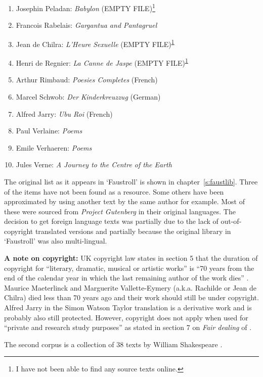 \begin{enumerate}[start=0]
\item Josephin Peladan: \textit{Babylon} (EMPTY FILE)\footnote{I have not been able to find any source texts online.\label{emptyfile}}
\item Francois Rabelais: \textit{Gargantua and Pantagruel}
\item Jean de Chilra: \textit{L'Heure Sexuelle} (EMPTY FILE)\textsuperscript{\ref{emptyfile}}
\item Henri de Regnier: \textit{La Canne de Jaspe} (EMPTY FILE)\textsuperscript{\ref{emptyfile}}
\item Arthur Rimbaud: \textit{Poesies Completes} (French)
\item Marcel Schwob: \textit{Der Kinderkreuzzug} (German)
\item Alfred Jarry: \textit{Ubu Roi} (French)
\item Paul Verlaine: \textit{Poems}
\item Emile Verhaeren: \textit{Poems}
\item Jules Verne: \textit{A Journey to the Centre of the Earth}
\end{enumerate}

The original list as it appears in `Faustroll' is shown in chapter~\ref{s:faustlib}. Three of the items have not been found as a resource. Some others have been approximated by using another text by the same author for example. Most of these were sourced from \emph{Project Gutenberg} \autocite{Gutenberg2016} in their original languages. The decision to get foreign language texts was partially due to the lack of out-of-copyright translated versions and partially because the original library in `Faustroll' was also multi-lingual.

\textbf{A note on copyright:} UK copyright law states in section 5 that the duration of copyright for ``literary, dramatic, musical or artistic works'' is ``70 years from the end of the calendar year in which the last remaining author of the work dies'' \autocite{Copyright2015}. Maurice Maeterlinck and Marguerite Vallette-Eymery (a.k.a. Rachilde or Jean de Chilra) died less than 70 years ago and their work should still be under copyright. Alfred Jarry in the Simon Watson Taylor translation is a derivative work and is probably also still protected. However, copyright does not apply when used for ``private and research study purposes'' as stated in section 7 on \textit{Fair dealing} of \autocite{Copyright2012}.

The second corpus is a collection of \num{38} texts by William Shakespeare \autocite*{Shakespeare2011}.

